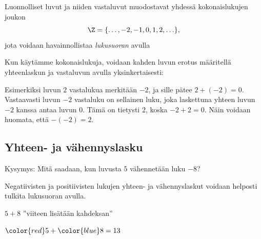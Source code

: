 Luonnolliset luvut ja niiden vastaluvut muodostavat yhdessä
kokonaislukujen joukon
\[\Z = \{\ldots, -2, -1, 0, 1, 2, \ldots\},\]
jota voidaan havainnollistaa \emph{lukusuoran} avulla

\begin{center}
\begin{lukusuora}{-4}{4}{10}

\end{lukusuora}
\end{center}

Kun käytämme kokonaislukuja, voidaan kahden luvun erotus määritellä
yhteenlaskun ja vastaluvun avulla yksinkertaisesti:

\laatikko{
\[m-n = m+(-n)\]
}

    Esimerkiksi luvun $2$ vastalukua merkitään $-2$, ja sille pätee $2+(-2)=0$. Vastaavasti luvun $-2$ vastaluku on sellainen luku, joka laskettuna yhteen luvun $-2$ kanssa antaa luvun $0$. Tämä on tietysti $2$, koska $-2+2=0$. Näin voidaan huomata, että $-(-2)=2$.
    

\subsection*{Yhteen- ja vähennyslasku}

    Kysymys: Mitä saadaan, kun luvusta $5$ vähennetään luku $-8$?
    
    Negatiivisten ja positiivisten lukujen yhteen- ja vähennyslaskut voidaan helposti tulkita lukusuoran avulla.
    
    
    $5+8$ ''viiteen lisätään kahdeksan''
    \begin{center}
      \begin{lukusuora}{-1}{14}{14}
        {\color{red} }
        \lukusuorauusi
        {\color{red} }
        {\color{blue} }
       \end{lukusuora}
       ${\color{red}5}+{\color{blue}8}=13$
    \end{center}
    
